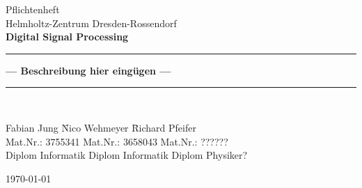 \documentclass[paper=a4, headings=small]{scrartcl}
\begin{document}
\begin{titlepage}
\begin{center}
	\large{Pflichtenheft\\ Helmholtz-Zentrum Dresden-Rossendorf } \\[10mm]
	\textbf{\Large{Digital Signal Processing}}\\[5mm]
	\rule{\linewidth}{0.5mm}
  \textbf{\LARGE{ --- Beschreibung hier eingügen ---}}
	\rule{\linewidth}{0.5mm}\\[3cm]

\parbox{0cm}{
\begin{tabbing}
  Fabian Jung	              \hspace{2cm}	\= Nico Wehmeyer  \hspace{2cm}	\= Richard Pfeifer\\
  Mat.Nr.:  3755341                         \> Mat.Nr.: 3658043			    \> Mat.Nr.: ??????\\
  Diplom Informatik 			            \> Diplom Informatik     	    \> Diplom Physiker?\\
\end{tabbing}
}

\vfill
{\large \today}
\end{center}

\end{titlepage}

\tableofcontents
\newpage

\newpage

\newpage

\end{document}
